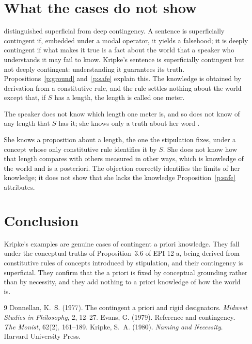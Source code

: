\documentclass{situationist-preprint}
\begin{document}
\section{What the cases do not show}

\citet{Evans1979} distinguished superficial from deep contingency. A sentence is superficially contingent if, embedded under a modal operator, it yields a falsehood; it is deeply contingent if what makes it true is a fact about the world that a speaker who understands it may fail to know. Kripke's sentence is superficially contingent but not deeply contingent: understanding it guarantees its truth. Propositions~\ref{p:ground} and~\ref{p:safe} explain this. The knowledge is obtained by derivation from a constitutive rule, and the rule settles nothing about the world except that, if $S$ has a length, the length is called one meter.

\begin{objection}
The speaker does not know which length one meter is, and so does not know of any length that $S$ has it; she knows only a truth about her word \citep{Donnellan1977}.
\end{objection}

\begin{reply}
She knows a proposition about a length, the one the stipulation fixes, under a concept whose only constitutive rule identifies it by $S$. She does not know how that length compares with others measured in other ways, which is knowledge of the world and is a posteriori. The objection correctly identifies the limits of her knowledge; it does not show that she lacks the knowledge Proposition~\ref{p:safe} attributes.
\end{reply}

\section{Conclusion}

Kripke's examples are genuine cases of contingent a priori knowledge. They fall under the conceptual truths of Proposition~3.6 of EPI-12-a, being derived from constitutive rules of concepts introduced by stipulation, and their contingency is superficial. They confirm that the a priori is fixed by conceptual grounding rather than by necessity, and they add nothing to a priori knowledge of how the world is.

\begin{thebibliography}{9}\small
{} Donnellan, K.~S. (1977). The contingent a priori and rigid designators. \emph{Midwest Studies in Philosophy}, 2, 12--27.
 Evans, G. (1979). Reference and contingency. \emph{The Monist}, 62(2), 161--189.
 Kripke, S.~A. (1980). \emph{Naming and Necessity}. Harvard University Press.
\end{thebibliography}
\end{document}
